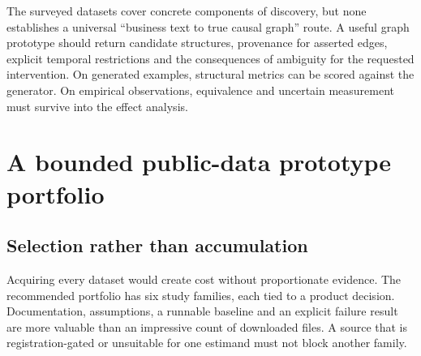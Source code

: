 The surveyed datasets cover concrete components of discovery, but none
establishes a universal ``business text to true causal graph'' route. A
useful graph prototype should return candidate structures, provenance
for asserted edges, explicit temporal restrictions and the consequences
of ambiguity for the requested intervention. On generated examples,
structural metrics can be scored against the generator. On empirical
observations, equivalence and uncertain measurement must survive into
the effect analysis.

\hypertarget{pd15:portfolio}{%
\chapter{A bounded public-data prototype
portfolio}\label{pd15:portfolio}}

\hypertarget{selection-rather-than-accumulation}{%
\section{Selection rather than
accumulation}\label{selection-rather-than-accumulation}}

Acquiring every dataset would create cost without proportionate
evidence. The recommended portfolio has six study families, each tied to
a product decision. Documentation, assumptions, a runnable baseline and
an explicit failure result are more valuable than an impressive count of
downloaded files. A source that is registration-gated or unsuitable for
one estimand must not block another family.

